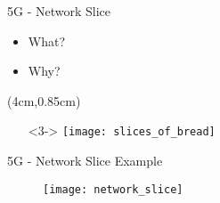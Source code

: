 \begin{frame}{5G - Network Slice}
\begin{itemize}
 \item<1-> What? %
 \item<2-> Why? %
\end{itemize}

\begin{textblock*}{5cm}(4cm,0.85cm)
  \begin{itemize}
  \item[]<3-> \texttt{[image: slices\_of\_bread]}
  \end{itemize}
\end{textblock*}
\end{frame}

\begin{frame}{5G - Network Slice Example}
  \begin{figure}
    \centering
    \texttt{[image: network\_slice]}
  \end{figure}
\end{frame}
